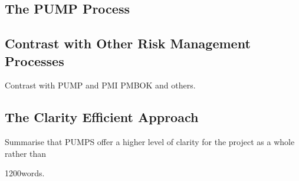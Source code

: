 \subsection{The PUMP Process}

\subsection{Contrast with Other Risk Management Processes}
Contrast with PUMP and PMI PMBOK and others.

\subsection{The Clarity Efficient Approach}
Summarise that PUMPS offer a higher level of clarity for the project as a whole rather than 


1200words.